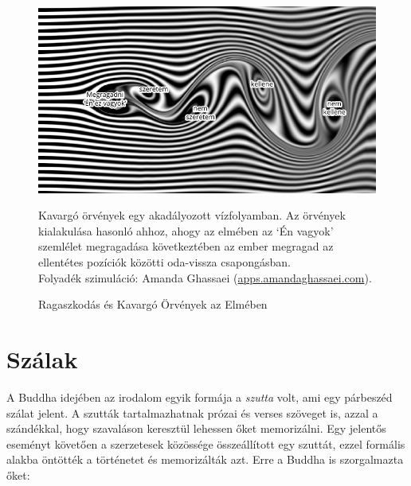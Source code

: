 \begin{figure}[h]
\caption{Ragaszkodás és Kavargó Örvények az Elmében}\label{fig-grasping-turbulence}

\hspace*{-2.5mm}%
\includegraphics[width=\linewidth]{./manuscript/tex/diagrams/grasping-turbulence-hu.pdf}

\bigskip

\hspace*{10mm}%
\begin{minipage}{\linewidth-20mm}
\footnotesize
Kavargó örvények egy akadályozott vízfolyamban.
Az örvények kialakulása hasonló ahhoz, ahogy az elmében az `Én vagyok' szemlélet megragadása következtében
az ember megragad az ellentétes pozíciók közötti oda-vissza csapongásban.\\
Folyadék szimuláció:
Amanda Ghassaei (\href{http://apps.amandaghassaei.com/VortexShedding/}{apps.amandaghassaei.com}).
\end{minipage}

\end{figure}

\vfill\null
\clearpage
\normalpagelayout

\section{Szálak}


\noindent A Buddha idejében az irodalom egyik formája a \emph{szutta}
volt, ami egy párbeszéd szálat jelent. A szutták tartalmazhatnak prózai
és verses szöveget is, azzal a szándékkal, hogy szavaláson keresztül
lehessen őket memorizálni. Egy jelentős eseményt követően a szerzetesek
közössége összeállított egy szuttát, ezzel formális alakba öntötték a
történetet és memorizálták azt. Erre a Buddha is szorgalmazta őket:

